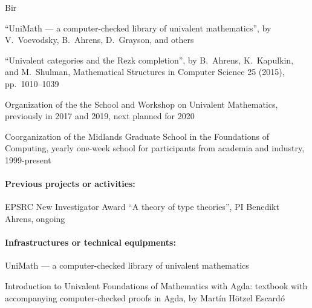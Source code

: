 \begin{sitedescription}{Bir}
\begin{compactitem}
 \item ``UniMath --- a computer-checked library of univalent mathematics'', by V.~Voevodsky, B.~Ahrens, D.~Grayson, and others
 \item ``Univalent categories and the Rezk completion'', by B.~Ahrens, K.~Kapulkin, and M.~Shulman, Mathematical Structures in Computer Science 25 (2015), pp.~1010--1039
 \item Organization of the the School and Workshop on Univalent Mathematics, previously in 2017 and 2019, next planned for 2020
 \item Coorganization of the Midlands Graduate School in the Foundations of Computing,  yearly one-week school for participants from academia and industry, 1999-present
\end{compactitem}

\paragraph*{Previous projects or activities:}

\begin{compactitem}
 \item EPSRC New Investigator Award ``A theory of type theories'', PI Benedikt Ahrens, ongoing
\end{compactitem}

\paragraph*{Infrastructures or technical equipments:}
\begin{compactitem}
 \item UniMath --- a computer-checked library of univalent mathematics
 \item Introduction to Univalent Foundations of Mathematics with Agda: textbook with accompanying computer-checked proofs in Agda, by Martín Hötzel Escardó
\end{compactitem}


% 


\end{sitedescription}
